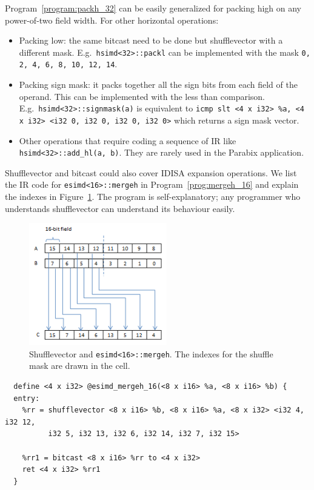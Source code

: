 Program~\ref{program:packh_32} can be easily generalized for packing high on any power-of-two field width. For other horizontal operations:
\begin{itemize}
    \item Packing low: the same bitcast need to be done but shufflevector with a different mask. E.g.\ {\tt hsimd<32>::packl} can be implemented with the mask {\tt 0, 2, 4, 6, 8, 10, 12, 14}.
    \item Packing sign mask: it packs together all the sign bits from each field of the operand. This can be implemented with the less than comparison. E.g.\ {\tt hsimd<32>::signmask(a)} is equivalent to \verb|icmp slt <4 x i32> %a, <4 x i32> <i32 0, i32 0, i32 0, i32 0>| which returns a {\tt <4 x i1>} sign mask vector.
    \item Other operations that require coding a sequence of IR like {\tt hsimd<32>::add\_hl(a, b)}. They are rarely used in the Parabix application.
\end{itemize}

Shufflevector and bitcast could also cover IDISA expansion operations. We list the IR code for {\tt esimd<16>::mergeh} in Program~\ref{prog:mergeh_16} and explain the indexes in Figure~\ref{fig:mergeh_16}. The program is self-explanatory; any programmer who understands shufflevector can understand its behaviour easily.

\begin{figure}[ht!]
\centering
\includegraphics[width=60mm]{draw/mergeh_16.png}
\caption[Implement {\tt esimd<16>::mergeh} with shufflevector]{Shufflevector and {\tt esimd<16>::mergeh}. The indexes for the shuffle mask are drawn in the cell.}
\label{fig:mergeh_16}
\end{figure}

\begin{program}
\begin{verbatim}
  define <4 x i32> @esimd_mergeh_16(<8 x i16> %a, <8 x i16> %b) {
  entry:
    %rr = shufflevector <8 x i16> %b, <8 x i16> %a, <8 x i32> <i32 4, i32 12,
          i32 5, i32 13, i32 6, i32 14, i32 7, i32 15>

    %rr1 = bitcast <8 x i16> %rr to <4 x i32>
    ret <4 x i32> %rr1
  }
\end{verbatim}
\caption[Shufflevector implementation of mergeh.]{Shufflevector and {\tt esimd<16>::mergeh} in LLVM IR\@. Expansion operations double the width of fields.}
\label{prog:mergeh_16}
\end{program}

